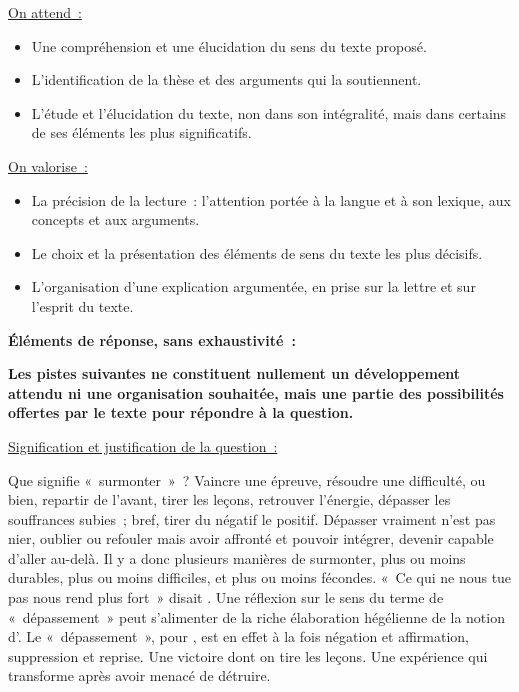 {\underline{On attend~:}

\begin{itemize}
\item Une compréhension et une élucidation du sens du texte proposé.
\item L'identification de la thèse et des arguments qui la soutiennent.
\item L'étude et l'élucidation du texte, non dans son intégralité, mais dans certains de ses
éléments les plus significatifs.
\end{itemize}

\underline{On valorise~:}

\begin{itemize}
\item La précision de la lecture~: l'attention portée à la langue et à son lexique, aux concepts et
aux arguments.
\item Le choix et la présentation des éléments de sens du texte les plus décisifs.
\item L'organisation d'une explication argumentée, en prise sur la lettre et sur l'esprit du texte.
\end{itemize}

\bigskip

\textbf{Éléments de réponse, sans exhaustivité~:}

\textbf{Les pistes suivantes ne constituent nullement un développement attendu ni une organisation
souhaitée, mais une partie des possibilités offertes par le texte pour répondre à la question.}

\underline{Signification et justification de la question~:}

Que signifie «~surmonter~»~? Vaincre une épreuve, résoudre une difficulté, ou bien, repartir
de l'avant, tirer les leçons, retrouver l'énergie, dépasser les souffrances subies~; bref, tirer du
négatif le positif. Dépasser vraiment n'est pas nier, oublier ou refouler mais avoir affronté et
pouvoir intégrer, devenir capable d'aller au-delà. Il y a donc plusieurs manières de surmonter, plus
ou moins durables, plus ou moins difficiles, et plus ou moins fécondes.
«~Ce qui ne nous tue pas nous rend plus fort~» disait . Une réflexion sur le sens
du terme de «~dépassement~» peut s'alimenter de la riche élaboration hégélienne de la notion
d'. Le «~dépassement~», pour , est en effet à la fois négation et affirmation,
suppression et reprise. Une victoire dont on tire les leçons. Une expérience qui transforme après
avoir menacé de détruire.

}
